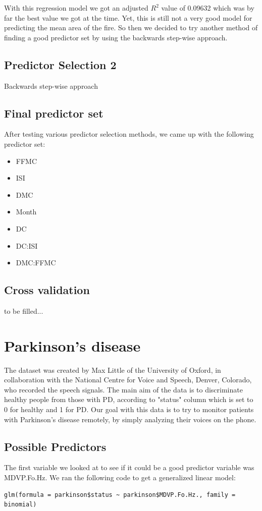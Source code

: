 \documentclass{article}
\begin{document}
With this regression model we got an adjusted $R^{2}$ value of 0.09632 which was by far the best value we got at the time. Yet, this is still not a very good model for predicting the mean area of the fire. So then we decided to try another method of finding a good predictor set by using the backwards step-wise approach.

\subsection{Predictor Selection 2}
Backwards step-wise approach

\subsection{Final predictor set}

After testing various predictor selection methods, we came up with the following predictor set:
\begin{itemize}
	\item FFMC
	\item ISI
	\item DMC
	\item Month
	\item DC
	\item DC:ISI
	\item DMC:FFMC
\end{itemize}

\subsection{Cross validation}

to be filled...


\section{Parkinson's disease}

The dataset was created by Max Little of the University of Oxford, in collaboration with the
National Centre for Voice and Speech, Denver, Colorado, who recorded the speech signals. The
main aim of the data is to discriminate healthy people from those with PD, according to
"status" column which is set to 0 for healthy and 1 for PD. Our goal with this data is to
try to monitor patients with Parkinson's disease remotely, by simply analyzing their voices
on the phone.

\subsection{Possible Predictors}
The first variable we looked at to see if it could be a good predictor variable was MDVP.Fo.Hz. We ran the following code to get a generalized linear model: 
\begin{verbatim}
glm(formula = parkinson$status ~ parkinson$MDVP.Fo.Hz., family = binomial)
\end{verbatim}
\end{document}
